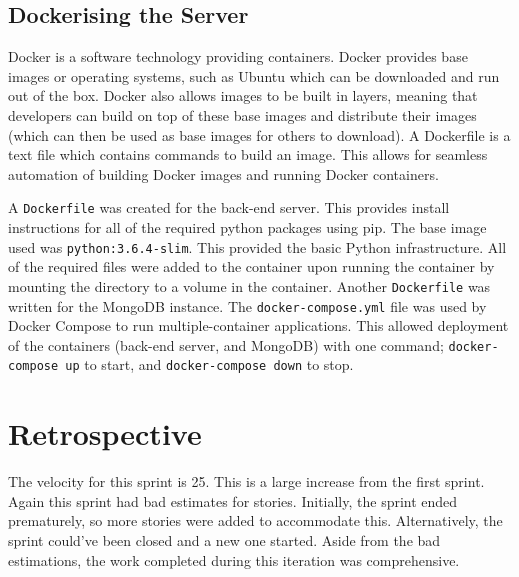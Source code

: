 \subsection{Dockerising the Server}
Docker is a software technology providing containers. Docker provides base images or operating systems, such as Ubuntu which can be downloaded and run out of the box. Docker also allows images to be built in layers, meaning that developers can build on top of these base images and distribute their images (which can then be used as base images for others to download). A Dockerfile is a text file which contains commands to build an image. This allows for seamless automation of building Docker images and running Docker containers.

A \texttt{Dockerfile} was created for the back-end server. This provides install instructions for all of the required python packages using pip. The base image used was \texttt{python:3.6.4-slim}. This provided the basic Python infrastructure. All of the required files were added to the container upon running the container by mounting the directory to a volume in the container. Another \texttt{Dockerfile} was written for the MongoDB instance. The \texttt{docker-compose.yml} file was used by Docker Compose to run multiple-container applications. This allowed deployment of the containers (back-end server, and MongoDB) with one command; \texttt{docker-compose up} to start, and \texttt{docker-compose down} to stop.

\section{Retrospective}
The velocity for this sprint is 25. This is a large increase from the first sprint. Again this sprint had bad estimates for stories. Initially, the sprint ended prematurely, so more stories were added to accommodate this. Alternatively, the sprint could've been closed and a new one started. Aside from the bad estimations, the work completed during this iteration was comprehensive.
